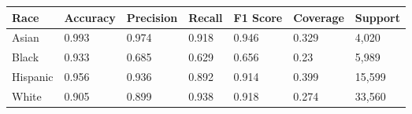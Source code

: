 \begin{tabular}{lllllll}
\toprule
Race & Accuracy & Precision & Recall & F1 Score & Coverage & Support \\
\midrule
Asian & 0.993 & 0.974 & 0.918 & 0.946 & 0.329 & 4,020 \\
Black & 0.933 & 0.685 & 0.629 & 0.656 & 0.23 & 5,989 \\
Hispanic & 0.956 & 0.936 & 0.892 & 0.914 & 0.399 & 15,599 \\
White & 0.905 & 0.899 & 0.938 & 0.918 & 0.274 & 33,560 \\
\bottomrule
\end{tabular}
